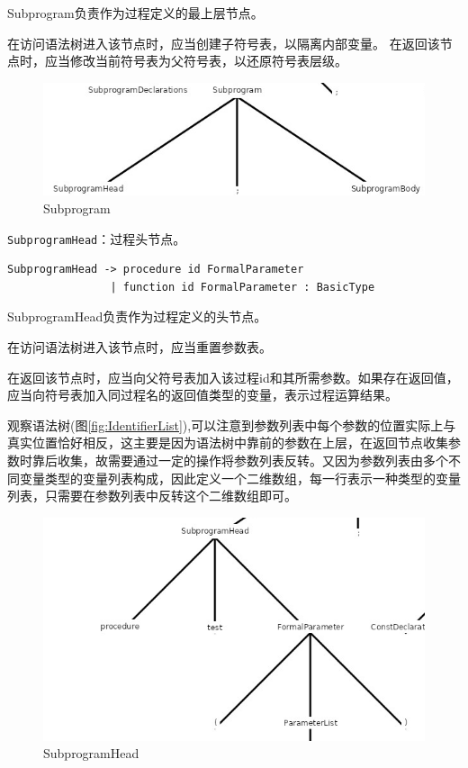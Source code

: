 \documentclass[../main.tex]{subfiles}
\begin{document}
Subprogram负责作为过程定义的最上层节点。

在访问语法树进入该节点时，应当创建子符号表，以隔离内部变量。
在返回该节点时，应当修改当前符号表为父符号表，以还原符号表层级。

\begin{figure}[h]
\centering
\includegraphics[width=0.8\linewidth ]{assets/类型检查/Subprogram.png}
\caption{Subprogram}
\label{fig:Subprogram}
\end{figure}

\texttt{SubprogramHead}：过程头节点。

\begin{lstlisting}[style=grammar]
SubprogramHead -> procedure id FormalParameter
                | function id FormalParameter : BasicType
\end{lstlisting}
                
SubprogramHead负责作为过程定义的头节点。

在访问语法树进入该节点时，应当重置参数表。

在返回该节点时，应当向父符号表加入该过程id和其所需参数。如果存在返回值，应当向符号表加入同过程名的返回值类型的变量，表示过程运算结果。

观察语法树(图\ref{fig:IdentifierList}),可以注意到参数列表中每个参数的位置实际上与真实位置恰好相反，这主要是因为语法树中靠前的参数在上层，在返回节点收集参数时靠后收集，故需要通过一定的操作将参数列表反转。又因为参数列表由多个不同变量类型的变量列表构成，因此定义一个二维数组，每一行表示一种类型的变量列表，只需要在参数列表中反转这个二维数组即可。

\begin{figure}[h]
\centering
\includegraphics[width=0.8\linewidth ]{assets/类型检查/SubprogramHead.png}
\caption{SubprogramHead}
\label{fig:SubprogramHead}
\end{figure}
\end{document}
